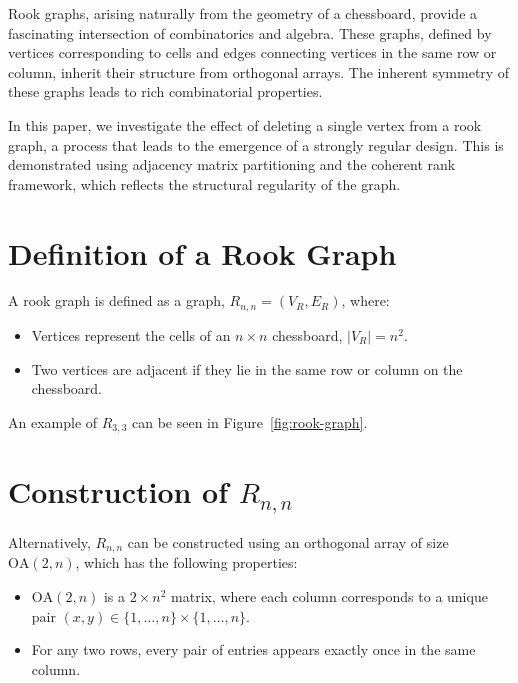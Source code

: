 \documentclass{article}
\begin{document}
Rook graphs, arising naturally from the geometry of a chessboard, provide a fascinating intersection of combinatorics and algebra. These graphs, defined by vertices corresponding to cells and edges connecting vertices in the same row or column, inherit their structure from orthogonal arrays. The inherent symmetry of these graphs leads to rich combinatorial properties.

In this paper, we investigate the effect of deleting a single vertex from a rook graph, a process that leads to the emergence of a strongly regular design. This is demonstrated using adjacency matrix partitioning and the coherent rank framework, which reflects the structural regularity of the graph.

\section{Definition of a Rook Graph}

A rook graph is defined as a graph, \(R_{n,n} = (V_R,E_R)\), where:
\begin{itemize}
    \item Vertices represent the cells of an \( n \times n \) chessboard, \(|V_R| = n^2\).
    \item Two vertices are adjacent if they lie in the same row or column on the chessboard.
\end{itemize}
An example of \(R_{3,3}\) can be seen in Figure~\ref{fig:rook-graph}. 

\section{Construction of \(R_{n,n}\)}

Alternatively, \(R_{n,n}\) can be constructed using an orthogonal array of size \( \text{OA}(2, n) \), which has the following properties:
\begin{itemize}
    \item \( \text{OA}(2, n) \) is a \( 2 \times n^2 \) matrix, where each column corresponds to a unique pair \( (x, y) \in \{1, \dots, n\} \times \{1, \dots, n\} \).
    \item For any two rows, every pair of entries appears exactly once in the same column.
\end{itemize}
\end{document}
